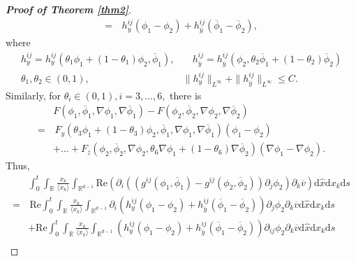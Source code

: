 \documentclass[10pt,twoside,a4paper]{article}
\numberwithin{equation}{section}\allowdisplaybreaks
\def\leq{\leqslant}
\begin{document}
\begin{proof}[\textbf{Proof of Theorem \ref{thm2}}]
\begin{align*}
 		=&\,h^{ij}_y (\phi_1- \phi_2)
 		+ h^{ij}_{\overline{y}} (\overline{\phi}_1-\overline{\phi}_2),
 	\end{align*}
 	where 
 	\begin{align} \label{mean_h}
 		h^{ij}_y= h^{ij}_y\left(\theta_1\phi_1+(1-\theta_1)\phi_2,\overline{\phi}_1\right),&\quad h^{ij}_{\overline{y}}=h^{ij}_{\overline{y}}\left(\phi_2,\theta_2\overline{\phi}_1+(1-\theta_2)\overline{\phi}_2\right)\\ 
 		\theta_1, \theta_2 \in (0,1),\qquad&\| h^{ij}_y\|_{L^\infty} +\| h^{ij}_{\overline{y}}\|_{L^\infty}  \leq C. \nonumber
 	\end{align}
 	Similarly, for $ \theta_i \in (0,1),i=3,\dots,6, $ there is
 	\begin{align*}
 		&F\left(\phi_1,\overline{\phi}_1,\nabla\phi_1, \nabla \overline{\phi}_1\right)-F\left(\phi_2,\overline{\phi}_2,\nabla\phi_2, \nabla \overline{\phi}_2\right)\\
 		=&\,F_y \left(\theta_3\phi_1+(1-\theta_3)\phi_2,\overline{\phi}_1,\nabla\phi_1, \nabla \overline{\phi}_1\right) (\phi_1-\phi_2)\\
 		&+\dots+ F_{\overline{z}} \left(\phi_2,\overline{\phi}_2,\nabla\phi_2,\theta_6 \nabla\phi_1+(1-\theta_6)\nabla \overline{\phi}_2\right) (\nabla\phi_1-\nabla\phi_2).
 	\end{align*}
 	Thus,
 	\begin{align} \label{momterm1}
 		&\int_0^t \int_{\mathbb{R}}\frac{x_k}{\langle x_k\rangle} 	\int_{\mathbb{R}^{d-1}} \mathrm{Re} \left(\partial_i\left( (g^{ij}\left(\phi_1,\overline{\phi}_1\right)-g^{ij}\left(\phi_2,\overline{\phi}_2\right)) \partial_j\phi_2\right)\partial_k \overline{v} \right)   \mathrm{d} \hat{x}  \mathrm{d} x_k \mathrm{d}s \\
 		=&\, \mathrm{Re}  \int_0^t \int_{\mathbb{R}}\frac{x_k}{\langle x_k\rangle} 	\int_{\mathbb{R}^{d-1}} \partial_i\left( h^{ij}_y  \left(\phi_1 -  \phi_2 \right)+h^{ij}_{\overline{y}} (\overline{\phi}_1-\overline{\phi}_2)\right) \partial_j\phi_2\partial_k \overline{v}  \mathrm{d} \hat{x}  \mathrm{d} x_k \mathrm{d}s \nonumber\\
 		&+ \mathrm{Re}\int_0^t \int_{\mathbb{R}}\frac{x_k}{\langle x_k\rangle} 	\int_{\mathbb{R}^{d-1}}   \left( h^{ij}_y  \left(\phi_1 -  \phi_2 \right)+h^{ij}_{\overline{y}} (\overline{\phi}_1-\overline{\phi}_2)\right)\partial_{ij}\phi_2\partial_k \overline{v}   \mathrm{d} \hat{x}  \mathrm{d} x_k \mathrm{d}s\nonumber \\

\end{align}
\end{proof}
\end{document}
